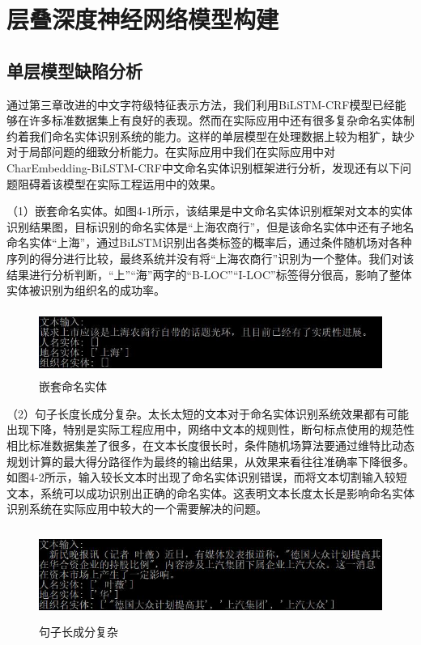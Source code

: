 \documentclass[winfonts,master,oneside,nobackinfo]{njuthesis}
\begin{document}
\section{层叠深度神经网络模型构建}

\subsection{单层模型缺陷分析}

通过第三章改进的中文字符级特征表示方法，我们利用BiLSTM-CRF模型已经能够在许多标准数据集上有良好的表现。然而在实际应用中还有很多复杂命名实体制约着我们命名实体识别系统的能力。这样的单层模型在处理数据上较为粗犷，缺少对于局部问题的细致分析能力。在实际应用中我们在实际应用中对CharEmbedding-BiLSTM-CRF中文命名实体识别框架进行分析，发现还有以下问题阻碍着该模型在实际工程运用中的效果。

（1）嵌套命名实体。如图4-1所示，该结果是中文命名实体识别框架对文本的实体识别结果图，目标识别的命名实体是“上海农商行”，但是该命名实体中还有子地名命名实体“上海”，通过BiLSTM识别出各类标签的概率后，通过条件随机场对各种序列的得分进行比较，最终系统并没有将“上海农商行”识别为一个整体。我们对该结果进行分析判断，“上”“海”两字的“B-LOC”“I-LOC”标签得分很高，影响了整体实体被识别为组织名的成功率。

\begin{figure}[H]
\centering
\begin{minipage}[t]{\textwidth}
\includegraphics[width=1\textwidth,height=2.14cm]{./figure/嵌套命名实体.jpg}
\caption{嵌套命名实体}
\label{lab:1}
\end{minipage}
\end{figure}

（2）句子长度长成分复杂。太长太短的文本对于命名实体识别系统效果都有可能出现下降，特别是实际工程应用中，网络中文本的规则性，断句标点使用的规范性相比标准数据集差了很多，在文本长度很长时，条件随机场算法要通过维特比动态规划计算的最大得分路径作为最终的输出结果，从效果来看往往准确率下降很多。如图4-2所示，输入较长文本时出现了命名实体识别错误，而将文本切割输入较短文本，系统可以成功识别出正确的命名实体。这表明文本长度太长是影响命名实体识别系统在实际应用中较大的一个需要解决的问题。


\begin{figure}[H]
\centering
\begin{minipage}[t]{\textwidth}
\includegraphics[width=1\textwidth,height=3cm]{./figure/句子长成分复杂.jpg}
\caption{句子长成分复杂}
\label{lab:1}
\end{minipage}
\end{figure}
\end{document}
